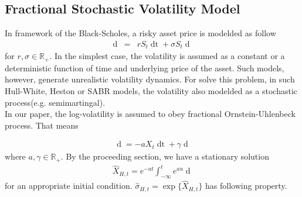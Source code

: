 \documentclass[a4paper, twoside, 11pt]{article}
\theoremstyle{definition}
\begin{document}
\subsection{Fractional Stochastic Volatility Model}
In framework of the Black-Scholes, a risky asset price is modelded as follow
\begin{eqnarray}
  \mathop{dS_t} &=& rS_t\mathop{dt} + \sigma S_t \mathop{dB_t}
\end{eqnarray}
for $r, \sigma \in \mathbb{R}_{+}$. In the simplest case, the volatility is assumed as a constant or a deterministic function of time and underlying price of the asset. Such models, however, generate unrealistic volatility dynamics. For solve this problem, in 
such  Hull-White, Heston or SABR models, the volatility also modelded as a stochastic process(e.g. semimartingal).\\
In our paper,  the log-volatility is assumed to obey fractional Ornstein-Uhlenbeck process. That means

\begin{eqnarray}
  \mathop{dX_t} = -a X_t \mathop{dt} + \gamma \mathop{dU_H(t)}
  \label{sec:fv}
\end{eqnarray}
where $a, \gamma \in \mathbb{R}_{+}$. By the proceeding section, we have a stationary solution 
\begin{eqnarray}
\hat{X}_{H,t}= e^{-at}\int_{-\infty}^t e^{au}\mathop{dU_H(u)}
\label{sec:fv2}
\end{eqnarray}
for an appropriate initial condition. $\hat{\sigma}_{H,t} = \exp\{\hat{X}_{H,t}\}$ has following property. %
\end{document}
